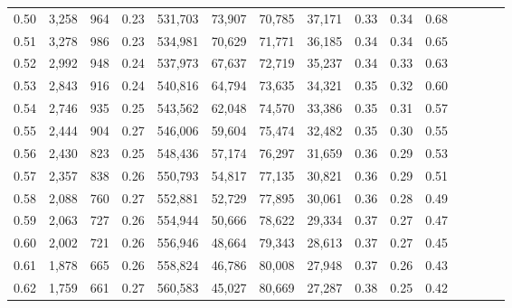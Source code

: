 \begin{tabular}{rrrcrrrrrrrrrrr}
0.50 &   3,258 &     964 &                                       0.23 &  531,703 &   73,907 &   70,785 &   37,171 &  0.33 &  0.34 &                         0.68 \\
0.51 &   3,278 &     986 &                                       0.23 &  534,981 &   70,629 &   71,771 &   36,185 &  0.34 &  0.34 &                         0.65 \\
0.52 &   2,992 &     948 &                                       0.24 &  537,973 &   67,637 &   72,719 &   35,237 &  0.34 &  0.33 &                         0.63 \\
0.53 &   2,843 &     916 &                                       0.24 &  540,816 &   64,794 &   73,635 &   34,321 &  0.35 &  0.32 &                         0.60 \\
0.54 &   2,746 &     935 &                                       0.25 &  543,562 &   62,048 &   74,570 &   33,386 &  0.35 &  0.31 &                         0.57 \\
0.55 &   2,444 &     904 &                                       0.27 &  546,006 &   59,604 &   75,474 &   32,482 &  0.35 &  0.30 &                         0.55 \\
0.56 &   2,430 &     823 &                                       0.25 &  548,436 &   57,174 &   76,297 &   31,659 &  0.36 &  0.29 &                         0.53 \\
0.57 &   2,357 &     838 &                                       0.26 &  550,793 &   54,817 &   77,135 &   30,821 &  0.36 &  0.29 &                         0.51 \\
0.58 &   2,088 &     760 &                                       0.27 &  552,881 &   52,729 &   77,895 &   30,061 &  0.36 &  0.28 &                         0.49 \\
0.59 &   2,063 &     727 &                                       0.26 &  554,944 &   50,666 &   78,622 &   29,334 &  0.37 &  0.27 &                         0.47 \\
0.60 &   2,002 &     721 &                                       0.26 &  556,946 &   48,664 &   79,343 &   28,613 &  0.37 &  0.27 &                         0.45 \\
0.61 &   1,878 &     665 &                                       0.26 &  558,824 &   46,786 &   80,008 &   27,948 &  0.37 &  0.26 &                         0.43 \\
0.62 &   1,759 &     661 &                                       0.27 &  560,583 &   45,027 &   80,669 &   27,287 &  0.38 &  0.25 &                         0.42 \\

\end{tabular}

